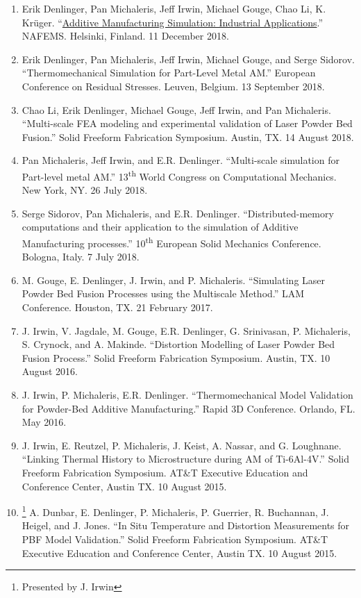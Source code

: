 \documentclass[10.5pt,letterpaper]{article}
\begin{document}
\begin{enumerate}[leftmargin=*]
	\item Erik Denlinger, Pan Michaleris, Jeff Irwin, Michael Gouge, Chao Li, K. Kr{\"u}ger.  ``\href{https://www.nafems.org/publications/resource_center/s_dec_18_dach_20/}{Additive Manufacturing Simulation:  Industrial Applications}.''  NAFEMS\@.  Helsinki, Finland.  11 December 2018.
	\item Erik Denlinger, Pan Michaleris, Jeff Irwin, Michael Gouge, and Serge Sidorov.  ``Thermomechanical Simulation for Part-Level Metal AM.''  European Conference on Residual Stresses.  Leuven, Belgium.  13 September 2018.
	\item Chao Li, Erik Denlinger, Michael Gouge, Jeff Irwin, and Pan Michaleris.  ``Multi-scale FEA modeling and experimental validation of Laser Powder Bed Fusion.'' Solid Freeform Fabrication Symposium.  Austin, TX. 14 August 2018.
	\item Pan Michaleris, Jeff Irwin, and E.R. Denlinger.  ``Multi-scale simulation for Part-level metal AM.''  13\textsuperscript{th} World Congress on Computational Mechanics.  New York, NY.  26 July 2018.
	\item Serge Sidorov, Pan Michaleris, and E.R. Denlinger.  ``Distributed-memory computations and their application to the simulation of Additive Manufacturing processes.''  10\textsuperscript{th} European Solid Mechanics Conference.  Bologna, Italy.  7 July 2018.
	\item M. Gouge, E. Denlinger, J. Irwin, and P. Michaleris.  ``Simulating Laser Powder Bed Fusion Processes using the Multiscale Method.''  LAM Conference.  Houston, TX.  21 February 2017.
	\item J. Irwin, V. Jagdale, M. Gouge, E.R. Denlinger, G. Srinivasan, P. Michaleris, S. Crynock, and A. Makinde.  ``Distortion Modelling of Laser Powder Bed Fusion Process.''  Solid Freeform Fabrication Symposium.  Austin, TX.  10 August 2016.
	\item J. Irwin, P. Michaleris, E.R. Denlinger.  ``Thermomechanical Model Validation for Powder-Bed Additive Manufacturing.''  Rapid 3D Conference.  Orlando, FL.  May 2016.
	\item J. Irwin, E. Reutzel, P. Michaleris, J. Keist, A. Nassar, and G. Loughnane. ``Linking Thermal History to Microstructure during AM of Ti-6Al-4V.'' Solid Freeform Fabrication Symposium. AT\&T Executive Education and Conference Center, Austin TX. 10 August 2015.
	\item \footnote{\label{note1}Presented by J. Irwin} A. Dunbar, E. Denlinger, P. Michaleris, P. Guerrier, R. Buchannan, J. Heigel, and J. Jones. ``In Situ Temperature and Distortion Measurements for PBF Model Validation.'' Solid Freeform Fabrication Symposium. AT\&T Executive Education and Conference Center, Austin TX. 10 August 2015.

\end{enumerate}
\end{document}
